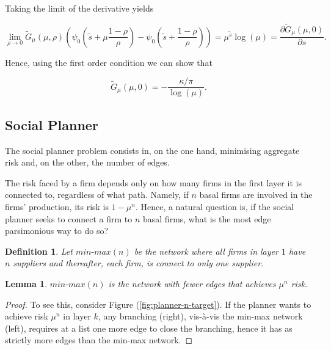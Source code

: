 \documentclass[american, abstract=on]{scrartcl}
\theoremstyle{plain}
\newtheorem{lemma}{Lemma}
\newtheorem{definition}{Definition}
\begin{document}
Taking the limit of the derivative yields

\begin{equation}
  \lim_{\rho \rightarrow 0}\tilde{G}_\mu(\mu, \rho) \left(\psi_0\left(\tilde{s} + \mu \frac{1 - \rho}{\rho} \right) - \psi_0\left(\tilde{s} + \frac{1 - \rho}{\rho} \right) \right) = \mu^{\tilde{s}} \log(\mu) = \frac{\partial \tilde{G}_{\mu}(\mu, 0)}{\partial s}.
\end{equation}

Hence, using the first order condition we can show that

\begin{equation}
  \tilde{G}_{\mu}(\mu, 0) = -\frac{\kappa / \pi}{\log(\mu)}.
\end{equation}

\subsection{Social Planner}

The social planner problem consists in, on the one hand, minimising aggregate risk and, on the other, the number of edges. 

The risk faced by a firm depends only on how many firms in the first layer it is connected to, regardless of what path. Namely, if $n$ basal firms are involved in the firms' production, its risk is $1 - \mu^n$. Hence, a natural question is, if the social planner seeks to connect a firm to $n$ basal firms, what is the most edge parsimonious way to do so? 

\begin{definition}
  Let $\textit{min-max}(n)$ be the network where all firms in layer $1$ have $n$ suppliers and thereafter, each firm, is connect to only one supplier. 
\end{definition}

\begin{lemma}
  $\textit{min-max}(n)$ is the network with fewer edges that achieves $\mu^n$ risk.
\end{lemma}

\begin{proof}

To see this, consider Figure (\ref{fig:planner-n-target}). If the planner wants to achieve risk $\mu^n$ in layer $k$, any branching (right), vis-à-vis the min-max network (left), requires at a list one more edge to close the branching, hence it has as strictly more edges than the min-max network.

\end{proof}
\end{document}
